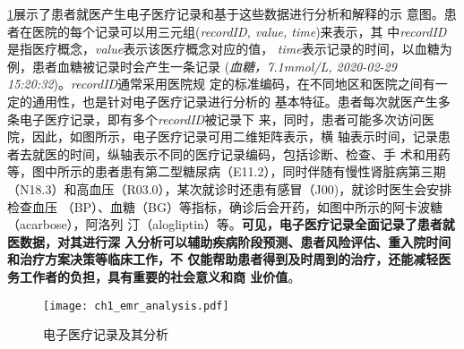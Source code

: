 \cref{fig:ch1:emr}展示了患者就医产生电子医疗记录和基于这些数据进行分析和解释的示
意图。患者在医院的每个记录可以用三元组(\textit{recordID, value, time})来表示，其
中\textit{recordID}是指医疗概念，\textit{value}表示该医疗概念对应的值，
\textit{time}表示记录的时间，以血糖为例，患者血糖被记录时会产生一条记录
(\textit{血糖，7.1mmol/L, 2020-02-29 15:20:32})。\textit{recordID}通常采用医院规
定的标准编码，在不同地区和医院之间有一定的通用性，也是针对电子医疗记录进行分析的
基本特征。患者每次就医产生多条电子医疗记录，即有多个\textit{recordID}被记录下
来，同时，患者可能多次访问医院，因此，如图所示，电子医疗记录可用二维矩阵表示，横
轴表示时间，记录患者去就医的时间，纵轴表示不同的医疗记录编码，包括诊断、检查、手
术和用药等，图中所示的患者患有第二型糖尿病（E11.2），同时伴随有慢性肾脏病第三期
（N18.3）和高血压（R03.0），某次就诊时还患有感冒（J00)，就诊时医生会安排检查血压
（BP）、血糖（BG）等指标，确诊后会开药，如图中所示的阿卡波糖（acarbose），阿洛列
汀（alogliptin）等。\textbf{可见，电子医疗记录全面记录了患者就医数据，对其进行深
入分析可以辅助疾病阶段预测、患者风险评估、重入院时间和治疗方案决策等临床工作，不
仅能帮助患者得到及时周到的治疗，还能减轻医务工作者的负担，具有重要的社会意义和商
业价值}。

\begin{figure}%
    \begin{small}
        \begin{center}
            \texttt{[image: ch1\_emr\_analysis.pdf]}
        \end{center}
        \caption{电子医疗记录及其分析}
        \label{fig:ch1:emr}
    \end{small}
\end{figure}

